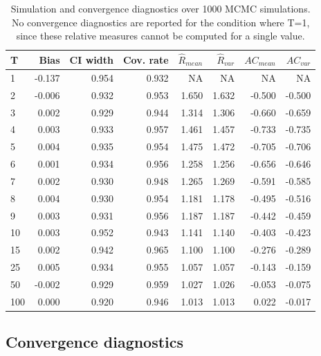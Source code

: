 \documentclass[article]{jss}
\begin{document}
\begin{table}[ht]
\centering
\caption{Simulation and convergence diagnostics over 1000 MCMC simulations. \footnotesize{No convergence diagnostics are reported for the condition where T=1, since these relative measures cannot be computed for a single value.}}
\label{tab:results}
\begin{tabular}{lrrrrrrr}
  \hline
T & Bias & CI width & Cov. rate & $\widehat{R}_{mean}$ & $\widehat{R}_{var}$ & $AC_{mean}$ & $AC_{var}$ \\
  \hline
   1 & -0.137 & 0.954 & 0.932 & NA & NA & NA & NA \\
     2 & -0.006 & 0.932 & 0.953 & 1.650 & 1.632 & -0.500 & -0.500 \\
     3 & 0.002 & 0.929 & 0.944 & 1.314 & 1.306 & -0.660 & -0.659 \\
     4 & 0.003 & 0.933 & 0.957 & 1.461 & 1.457 & -0.733 & -0.735 \\
     5 & 0.004 & 0.935 & 0.954 & 1.475 & 1.472 & -0.705 & -0.706 \\
     6 & 0.001 & 0.934 & 0.956 & 1.258 & 1.256 & -0.656 & -0.646 \\
     7 & 0.002 & 0.930 & 0.948 & 1.265 & 1.269 & -0.591 & -0.585 \\
     8 & 0.004 & 0.930 & 0.954 & 1.181 & 1.178 & -0.495 & -0.516 \\
     9 & 0.003 & 0.931 & 0.956 & 1.187 & 1.187 & -0.442 & -0.459 \\
    10 & 0.003 & 0.952 & 0.943 & 1.141 & 1.140 & -0.403 & -0.423 \\
    15 & 0.002 & 0.942 & 0.965 & 1.100 & 1.100 & -0.276 & -0.289 \\
    25 & 0.005 & 0.934 & 0.955 & 1.057 & 1.057 & -0.143 & -0.159 \\
    50 & -0.002 & 0.929 & 0.959 & 1.027 & 1.026 & -0.053 & -0.075 \\
   100 & 0.000 & 0.920 & 0.946 & 1.013 & 1.013 & 0.022 & -0.017 \\
   \hline
\end{tabular}
\end{table}


\subsection{Convergence diagnostics}
\end{document}
